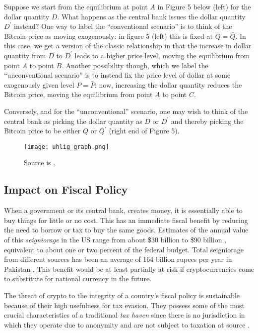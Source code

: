 \documentclass[12pt]{article}
\newcommand{\1}{\mathbbm 1}
\begin{document}
	
	
		Suppose we start from the equilibrium at point $A$ in Figure 5 below (left) for the dollar quantity $D$. What happens as the central bank issues the dollar quantity $D^{'}$ instead? One way to label the ``conventional scenario'' is to think of the Bitcoin price as moving exogenously: in figure 5 (left) this is fixed at $Q = \bar{Q}$. In this case, we get a version of the classic relationship in that the increase in dollar quantity from $D$ to ${D}^{'}$ leads to a higher price level, moving the equilibrium from point $A$ to point $B$. Another possibility though, which we label the ``unconventional scenario'' is to instead fix the price level of dollar at some exogenously given level $P = \bar{P}$: now, increasing the dollar quantity reduces the Bitcoin price, moving the equilibrium from point $A$ to point $C$.
		
		 Conversely, and for the ``unconventional'' scenario, one may wish to think of the central bank as picking the dollar quantity as $D$ or $D^{'}$ and thereby picking the Bitcoin price to be either $Q$ or $Q^{'}$ (right end of Figure 5).
		
		
			\begin{figure}[H]
			\begin{Center}
				\texttt{[image: uhlig\_graph.png]}		
				\caption{Source is \cite{schilling2019some}.}
			\end{Center}
		\end{figure}
		
		
		
		
		
		
		\subsection{Impact on Fiscal Policy}
		
		When a government or its central bank, creates money, it is essentially able to buy things for little or no cost. This has an immediate fiscal benefit by reducing the need to borrow or tax to buy the same goods. Estimates of the annual value of this \textit{seigniorage} in the US range from about \$30 billion to \$90 billion \cite{oliverwyman2018}, equivalent to about one or two percent of the federal budget. Total seigniorage from different sources has been an average of 164 billion rupees per year in Pakistan \cite{rao2011seigniorage}. This benefit would be at least partially at risk if cryptocurrencies come to substitute for national currency in the future.
		
		
		The threat of crypto to the integrity of a country's fiscal policy is sustainable because of their high usefulness for tax evasion. They possess some of the most crucial characteristics of a traditional \textit{tax haven} since there is no jurisdiction in which they operate due to anonymity and are not subject to taxation at source \cite{obu2021fiscal}. 
		
\end{document}
